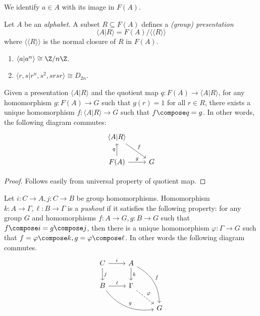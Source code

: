 \documentclass[a4paper]{article}
\begin{document}
\begin{notation}
  We identify \(a \in A\) with its image in \(F(A)\).
\end{notation}

\begin{definition}[presentation]
  Let \(A\) be an \emph{alphabet}. A subset \(R \subseteq F(A)\) defines a \emph{(group) presentation}
  \[
    \langle A | R \rangle = F(A) / \langle \langle R \rangle \rangle
  \]
  where \(\langle\langle R \rangle\rangle\) is the normal closure of \(R\) in \(F(A)\).
\end{definition}

\begin{eg}\leavevmode
  \begin{enumerate}
  \item \(\langle a | a^n \rangle \cong \Z/n\Z\).
  \item \(\langle r, s | r^n, s^2, srsr \rangle \cong D_{2n}\).
  \end{enumerate}
\end{eg}

\begin{lemma}
  Given a presentation \(\langle A | R\rangle\) and the quotient map \(q: F(A) \to \langle A | R \rangle\), for any homomorphism \(g: F(A) \to G\) such that \(g(r) = 1\) for all \(r \in R\), there exists a unique homomorphism \(f: \langle A | R \rangle \to G\) such that \(f \compose q = g\). In other words, the following diagram commutes:
  \[
    \begin{tikzcd}
      \langle A | R \rangle \ar[dr, "f"] \\
      F(A) \ar[u, "q"] \ar[r, "g"] & G
    \end{tikzcd}
  \]
\end{lemma}

\begin{proof}
  Follows easily from universal property of quotient map.
\end{proof}

\begin{definition}[pushout]
  Let \(i: C \to A, j: C \to B\) be group homomorphisms. Homomorphism \(k: A \to \Gamma, \ell: B \to \Gamma\) is a \emph{pushout} if it satisfies the following property: for any group \(G\) and homomorphisms \(f: A \to G, g: B \to G\) such that \(f \compose i = g \compose j\), then there is a unique homomorphism \(\varphi: \Gamma \to G\) such that \(f = \varphi \compose k, g = \varphi \compose \ell\). In other words the following diagram commutes.
  \[
    \begin{tikzcd}
      C \ar[r, "i"] \ar[d, "j"] & A \ar[d, "k"] \ar[ddr, bend left, "f"] \\
      B \ar[r, "\ell"] \ar[drr, bend right, "g"] & \Gamma \ar[dr, "\varphi", dashed] \\
      & & G
    \end{tikzcd}
  \]
\end{definition}
\end{document}
